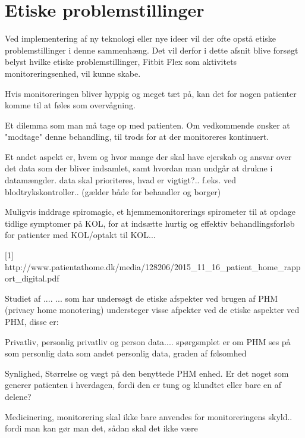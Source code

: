 \section{Etiske problemstillinger}

Ved implementering af ny teknologi eller nye ideer vil der ofte opstå etiske problemstillinger i denne sammenhæng. Det vil derfor i dette afsnit blive forsøgt belyst hvilke etiske problemstillinger, Fitbit Flex som aktivitets monitoreringsenhed, vil kunne skabe.

Hvis monitoreringen bliver hyppig og meget tæt på, kan det for nogen patienter komme til at føles som overvågning.

Et dilemma som man må tage op med patienten. Om vedkommende ønsker at "modtage" denne behandling, til trods for at der monitoreres kontinuert. 

Et andet aspekt er, hvem og hvor mange der skal have ejerskab og ansvar over det data som der bliver indsamlet, samt hvordan man undgår at drukne i datamængder. data skal prioriteres, hvad er vigtigt?.. f.eks. ved blodtrykskontroller.. (gælder både for behandler og borger)

Muligvis inddrage spiromagic, et hjemmemonitorerings spirometer til at opdage tidlige symptomer på KOL, for at indsætte hurtig og effektiv behandlingsforløb for patienter med KOL/optakt til KOL...


[1] http://www.patientathome.dk/media/128206/2015_11_16_patient_home_rapport_digital.pdf



Studiet af .... ... som har undersøgt de etiske afspekter ved brugen af PHM (privacy home monotering)  understeger visse afpekter ved de etiske aspekter ved PHM, disse er:

Privatliv,
personlig privatliv og person data.... spørgsmplet er om PHM ses på som personlig data som andet personlig data, graden af følsomhed

Synlighed, 
Størrelse og vægt på den benyttede PHM enhed. Er det noget som generer patienten i hverdagen, fordi den er tung og klundtet eller bare en af delene? 

Medicinering, 
monitorering skal ikke bare anvendes for monitoreringens skyld.. fordi man kan gør man det, sådan skal det ikke være

